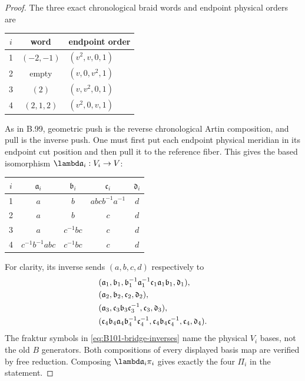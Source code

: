 \begin{proof}
The three exact chronological braid words and endpoint physical orders are
\begin{center}
\begin{tabular}{ccl}
\toprule
$i$&word&endpoint order\\
\midrule
1&$(-2,-1)$&$(v^2,v,0,1)$\\
2&empty&$(v,0,v^2,1)$\\
3&$(2)$&$(v,v^2,0,1)$\\
4&$(2,1,2)$&$(v^2,0,v,1)$\\
\bottomrule
\end{tabular}
\end{center}
As in B.99, geometric push is the reverse chronological Artin
composition, and pull is the inverse push.
One must first put each endpoint physical meridian in its endpoint
cut position and then pull it to the reference fiber.
This gives the based isomorphism $\lambd\mathfrak{a}_i:V_i\to V$:
\begin{center}
\begin{tabular}{c@{\qquad}cccc}
\toprule
$i$&$\mathfrak{a}_i$&$\mathfrak{b}_i$&$\mathfrak{c}_i$&$\mathfrak{d}_i$\\
\midrule
1&$a$&$b$&$abcb^{-1}a^{-1}$&$d$\\
2&$a$&$b$&$c$&$d$\\
3&$a$&$c^{-1}bc$&$c$&$d$\\
4&$c^{-1}b^{-1}abc$&$c^{-1}bc$&$c$&$d$\\
\bottomrule
\end{tabular}
\end{center}
For clarity, its inverse sends $(a,b,c,d)$ respectively to
\begin{align}
 &(\mathfrak{a}_1,\mathfrak{b}_1,\mathfrak{b}_1^{-1}\mathfrak{a}_1^{-1}\mathfrak{c}_1\mathfrak{a}_1\mathfrak{b}_1,\mathfrak{d}_1),\notag\\
 &(\mathfrak{a}_2,\mathfrak{b}_2,\mathfrak{c}_2,\mathfrak{d}_2),\notag\\
 &(\mathfrak{a}_3,\mathfrak{c}_3\mathfrak{b}_3\mathfrak{c}_3^{-1},\mathfrak{c}_3,\mathfrak{d}_3),\notag\\
 &(\mathfrak{c}_4\mathfrak{b}_4\mathfrak{a}_4\mathfrak{b}_4^{-1}\mathfrak{c}_4^{-1},\mathfrak{c}_4\mathfrak{b}_4\mathfrak{c}_4^{-1},\mathfrak{c}_4,\mathfrak{d}_4).
 \label{eq:B101-bridge-inverses}
\end{align}
The fraktur symbols in \eqref{eq:B101-bridge-inverses} name the physical
$V_i$ bases, not the old $B$ generators.
Both compositions of every displayed basis map are verified by free
reduction.  Composing $\lambd\mathfrak{a}_i\pi_i$ gives exactly the four
$\Pi_i$ in the statement.


\end{proof}
